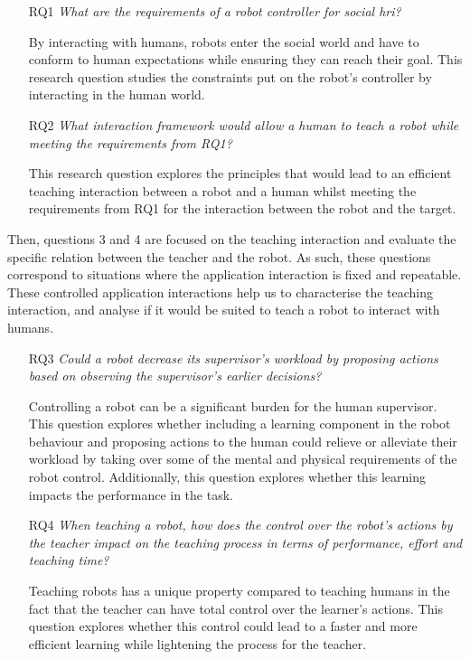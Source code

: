 \begin{itemize}
	\item [RQ1] \emph{What are the requirements of a robot controller for social \gls{hri}?} 
	
		By interacting with humans, robots enter the social world and have to conform to human expectations while ensuring they can reach their goal. This research question studies the constraints put on the robot's controller by interacting in the human world. 
		
    \item [RQ2] \emph{What interaction framework would allow a human to teach a robot while meeting the requirements from RQ1?}
    
    	This research question explores the principles that would lead to an efficient teaching interaction between a robot and a human whilst meeting the requirements from RQ1 for the interaction between the robot and the target. 
\end{itemize}    	

Then, questions 3 and 4 are focused on the teaching interaction and evaluate the specific relation between the teacher and the robot. As such, these questions correspond to situations where the application interaction is fixed and repeatable. These controlled application interactions help us to characterise the teaching interaction, and analyse if it would be suited to teach a robot to interact with humans.
\begin{itemize}
    \item [RQ3] \emph{Could a robot decrease its supervisor's workload by proposing actions based on observing the supervisor's earlier decisions?}
    
        Controlling a robot can be a significant burden for the human supervisor. This question explores whether including a learning component in the robot behaviour and proposing actions to the human could relieve or alleviate their workload by taking over some of the mental and physical requirements of the robot control. Additionally, this question explores whether this learning impacts the performance in the task.
    
    \item [RQ4] \emph{When teaching a robot, how does the control over the robot's actions by the teacher impact on the teaching process in terms of performance, effort and teaching time?} 
    
    	Teaching robots has a unique property compared to teaching humans in the fact that the teacher can have total control over the learner's actions. This question explores whether this control could lead to a faster and more efficient learning while lightening the process for the teacher.
\end{itemize}    	

